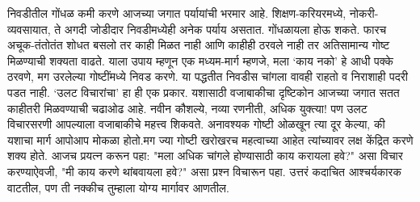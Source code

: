निवडीतील गोंधळ कमी करणे  
आजच्या जगात पर्यायांची भरमार आहे. शिक्षण-करियरमध्ये, नोकरी-व्यवसायात, ते अगदी जोडीदार निवडीमध्येही अनेक पर्याय असतात. गोंधळायला होऊ शकते. फारच अचूक-तंतोतंत शोधत बसलो तर काही मिळत नाही आणि काहीही ठरवले नाही तर अतिसामान्य गोष्ट मिळण्याची शक्यता वाढते. याला उपाय म्हणून एक मध्यम-मार्ग म्हणजे, मला ‘काय नको’ हे आधी पक्के ठरवणे, मग उरलेल्या गोष्टींमध्ये निवड करणे. या पद्धतीत निवडीस चांगला वावही राहतो व निराशाही पदरी पडत नाही. ‘उलट विचारांचा’ हा ही एक प्रकार. 
यशासाठी वजाबाकीचा दृष्टिकोन  
आजच्या जगात सतत काहीतरी मिळवण्याची चढाओढ आहे. नवीन कौशल्ये, नव्या रणनीती, अधिक युक्त्या! पण उलट विचारसरणी आपल्याला वजाबाकीचे महत्त्व शिकवते. अनावश्यक गोष्टी ओळखून त्या दूर केल्या, की यशाचा मार्ग आपोआप मोकळा होतो.मग ज्या गोष्टी खरोखरच महत्वाच्या आहेत त्यांच्यावर लक्ष केंद्रित करणे शक्य होते. आजच प्रयत्न करून पहा: "मला अधिक चांगले होण्यासाठी काय करायला हवे?" असा विचार करण्याऐवजी, "मी काय करणे थांबवायला हवे?" असा प्रश्न विचारून पहा. उत्तरं कदाचित आश्चर्यकारक वाटतील, पण ती नक्कीच तुम्हाला योग्य मार्गावर आणतील.

